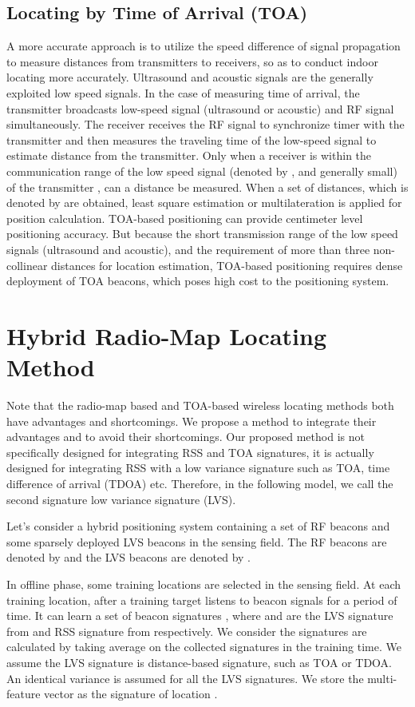 \documentclass[conference, 10pt]{IEEEtran}
\begin{document}
\subsection{Locating by Time of Arrival (TOA)} 
A more accurate approach is to utilize the speed difference of signal propagation to measure distances from transmitters to receivers, so as to conduct indoor locating more accurately\cite{zhao_autonomous_2008}\cite{gustafsson_positioning_2003}. Ultrasound and acoustic signals are the generally exploited low speed signals. In the case of measuring time of arrival, the transmitter broadcasts low-speed signal (ultrasound or acoustic) and RF signal simultaneously. The receiver receives the RF signal to synchronize timer with the transmitter and then measures the traveling time of the low-speed signal to estimate distance from the transmitter. Only when a receiver  is within the communication range of the low speed signal (denoted by , and generally small) of the transmitter , can a distance  be measured. When a set of distances, which is denoted by  are obtained, least square estimation or multilateration is applied for position calculation. TOA-based positioning can provide centimeter level positioning accuracy\cite{wang_lock:_2009}. But because the short transmission range of the low speed signals (ultrasound and acoustic), and the requirement of more than three non-collinear distances for location estimation, TOA-based positioning requires dense deployment of TOA beacons, which poses high cost to the positioning system.

\section{Hybrid Radio-Map Locating Method}
Note that the radio-map based and TOA-based wireless locating methods both have advantages and shortcomings. We propose a method to integrate their advantages and to avoid their shortcomings.  Our proposed method is not specifically designed for integrating RSS and TOA signatures, it is actually designed for integrating RSS with a low variance signature such as TOA, time difference of arrival (TDOA) etc.  Therefore, in the following model, we call the second signature low variance signature (LVS). 

Let's consider a hybrid positioning system containing a set of RF beacons and some sparsely deployed LVS beacons in the sensing field. The RF beacons are denoted by  and the LVS beacons are denoted by . 

In offline phase, some training locations  are selected in the sensing field. At each training location, after a training target listens to beacon signals for a period of time. It can learn a set of beacon signatures , where  and  are the LVS signature from  and RSS signature from  respectively.  We consider the signatures are calculated by taking average on the collected signatures in the training time. We assume the LVS signature is distance-based signature, such as TOA or TDOA. An identical variance  is assumed for all the LVS signatures. We store the multi-feature vector as the signature of location . 
\end{document}
